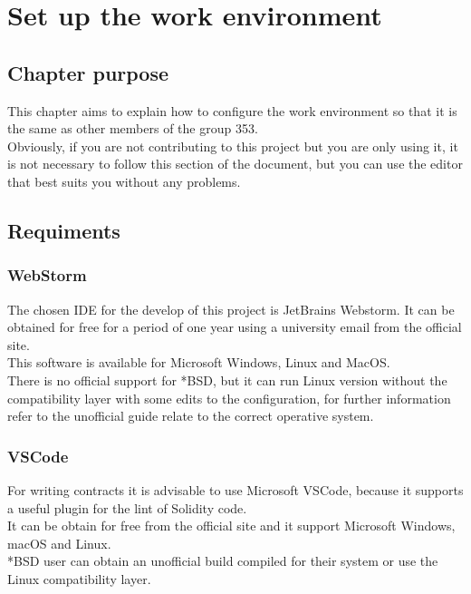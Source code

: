 \documentclass[ManualeSviluppatore.tex]{subfiles}
\begin{document}
\chapter{Set up the work environment}
\section{Chapter purpose}
This chapter aims to explain how to configure the work environment so that it is the same as other members of the group 353. \\
Obviously, if you are not contributing to this project but you are only using it, it is not necessary to follow this section of the document, but you can use the editor that best suits you without any problems.

\section{Requiments}
\subsection{WebStorm}
The chosen IDE for the develop of this project is JetBrains Webstorm. It can be obtained for free for a period of one year using a university email from the official site. \\
This software is available for Microsoft Windows, Linux and MacOS. \\
There is no official support for *BSD, but it can run Linux version without the compatibility layer with some edits to the configuration, for further information refer to the unofficial guide relate to the correct operative system.

\subsection{VSCode}
For writing contracts it is advisable to use Microsoft VSCode, because it supports a useful plugin for the lint of Solidity code. \\
It can be obtain for free from the official site and it support Microsoft Windows, macOS and Linux. \\
*BSD user can obtain an unofficial build compiled for their system or use the Linux compatibility layer. \\
\end{document}
